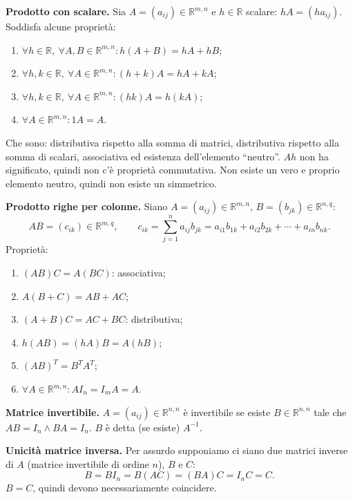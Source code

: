 \documentclass[11pt,a4paper]{article}
\newcommand{\pagina}[1]{\clearpage}
\begin{document}
\textbf{Prodotto con scalare.} Sia $A=(a_{ij})\in\mathbb R^{m,n}$ e $h\in\mathbb R$ scalare: $hA=(ha_{ij})$.
\pagina{10}
Soddisfa alcune proprietà:
\begin{enumerate}
\item $\forall h\in\mathbb R,\ \forall A,B\in\mathbb R^{m,n}:h(A+B)=hA+hB$;
\item $\forall h,k\in\mathbb R,\ \forall A\in\mathbb R^{m,n}:(h+k)A=hA+kA$;
\item $\forall h,k\in\mathbb R,\ \forall A\in\mathbb R^{m,n}:(hk)A=h(kA)$;
\item $\forall A\in\mathbb R^{m,n}:1A=A$.
\end{enumerate}
Che sono: distributiva rispetto alla somma di matrici, distributiva rispetto alla somma di scalari, associativa ed esistenza dell'elemento ``neutro''. $Ah$ non ha significato, quindi non c'è proprietà commutativa. Non esiste un vero e proprio elemento neutro, quindi non esiste un simmetrico.

\textbf{Prodotto righe per colonne.} Siano $A=(a_{ij})\in\mathbb R^{m,n}$, $B=(b_{jk})\in\mathbb R^{n,q}$:
\[AB=(c_{ik})\in\mathbb R^{m,q},\qquad c_{ik}=\sum_{j=1}^n a_{ij}b_{jk}=a_{i1}b_{1k}+a_{i2}b_{2k}+\cdots+a_{in}b_{nk}.\]
Proprietà:
\begin{enumerate}
\item $(AB)C=A(BC)$: associativa;
\item $A(B+C)=AB+AC$;
\item $(A+B)C=AC+BC$: distributiva;
\item $h(AB)=(hA)B=A(hB)$;
\item $(AB)^T=B^TA^T$;
\item $\forall A\in\mathbb R^{m,n}:AI_n=I_mA=A$.
\end{enumerate}
\pagina{11}
\textbf{Matrice invertibile.} $A=(a_{ij})\in\mathbb R^{n,n}$ è invertibile se esiste $B\in\mathbb R^{n,n}$ tale che $AB=I_n\wedge BA=I_n$. $B$ è detta (se esiste) $A^{-1}$.

\textbf{Unicità matrice inversa.} Per assurdo supponiamo ci siano due matrici inverse di $A$ (matrice invertibile di ordine $n$), $B$ e $C$:
\[B=BI_n=B(AC)=(BA)C=I_nC=C.\]
$B=C$, quindi devono necessariamente coincidere.
\end{document}
